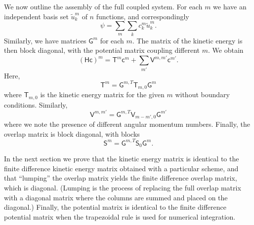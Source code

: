 \documentclass[12pt]{article}
\begin{document}
We now outline the assembly of the full coupled system. For each $m$ we have an independent basis set $\tilde{u}^m_k$ of $n$ functions, and correspondingly
\begin{equation}
    \psi = \sum_m \sum_k c_k^m \tilde{u}^m_k.
\end{equation}
Similarly, we have matrices $\mathsf{G}^m$ for each $m$. The matrix of the kinetic energy is then block diagonal, with the potential matrix coupling different $m$. We obtain
\begin{equation}
    (\mathsf{H} \mathsf{c})^m = \mathsf{T}^m \mathsf{c}^m + \sum_{m'} \mathsf{V}^{m,m'} \mathsf{c}^{m'}.
\end{equation}
Here,
\begin{equation}
    \mathsf{T}^m = \mathsf{G}^{m,T} \mathsf{T}_{m,0} \mathsf{G}^m
\end{equation} 
where $\mathsf{T}_{m,0}$ is the kinetic energy matrix for the given $m$ without boundary conditions. Similarly,
\begin{equation}
    \mathsf{V}^{m,m'} = \mathsf{G}^{m,T} \mathsf{V}_{m-m',0} \mathsf{G}^{m'}
\end{equation} 
where we note the presence of different angular momentum numbers. Finally, the overlap matrix is block diagonal, with blocks
\begin{equation}
    \mathsf{S}^{m} = \mathsf{G}^{m,T} \mathsf{S}_0 \mathsf{G}^m.
\end{equation}






In the next section we prove that the kinetic energy matrix is identical to the finite difference kinetic energy matrix obtained with a particular scheme, and that ``lumping'' the overlap matrix yields the finite difference overlap matrix, which is diagonal. (Lumping is the process of replacing the full overlap matrix with a diagonal matrix where the columns are summed and placed on the diagonal.) Finally, the potential matrix is identical to the finite difference potential matrix when the trapezoidal rule is used for numerical integration.
\end{document}
